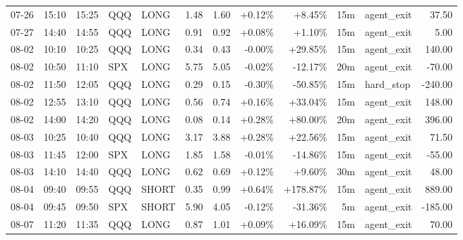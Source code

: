 \documentclass[11pt,a4paper]{article}
\begin{document}
\begin{center}
\begin{longtable}{>{\color{txtmain}}l l l l l r r r r r >{\color{txtmain}}l r}
07-26 & 15:10 & 15:25 & QQQ & LONG & 1.48 & 1.60 & \textcolor{wingreen}{+0.12\%} & \textcolor{wingreen}{+8.45\%} & 15m & agent\_exit & \textcolor{wingreen}{37.50} \\
07-27 & 14:40 & 14:55 & QQQ & LONG & 0.91 & 0.92 & \textcolor{wingreen}{+0.08\%} & \textcolor{wingreen}{+1.10\%} & 15m & agent\_exit & \textcolor{wingreen}{5.00} \\
08-02 & 10:10 & 10:25 & QQQ & LONG & 0.34 & 0.43 & \textcolor{lossred}{-0.00\%} & \textcolor{wingreen}{+29.85\%} & 15m & agent\_exit & \textcolor{wingreen}{140.00} \\
08-02 & 10:50 & 11:10 & SPX & LONG & 5.75 & 5.05 & \textcolor{lossred}{-0.02\%} & \textcolor{lossred}{-12.17\%} & 20m & agent\_exit & \textcolor{lossred}{-70.00} \\
08-02 & 11:50 & 12:05 & QQQ & LONG & 0.29 & 0.15 & \textcolor{lossred}{-0.30\%} & \textcolor{lossred}{-50.85\%} & 15m & hard\_stop & \textcolor{lossred}{-240.00} \\
08-02 & 12:55 & 13:10 & QQQ & LONG & 0.56 & 0.74 & \textcolor{wingreen}{+0.16\%} & \textcolor{wingreen}{+33.04\%} & 15m & agent\_exit & \textcolor{wingreen}{148.00} \\
08-02 & 14:00 & 14:20 & QQQ & LONG & 0.08 & 0.14 & \textcolor{wingreen}{+0.28\%} & \textcolor{wingreen}{+80.00\%} & 20m & agent\_exit & \textcolor{wingreen}{396.00} \\
08-03 & 10:25 & 10:40 & QQQ & LONG & 3.17 & 3.88 & \textcolor{wingreen}{+0.28\%} & \textcolor{wingreen}{+22.56\%} & 15m & agent\_exit & \textcolor{wingreen}{71.50} \\
08-03 & 11:45 & 12:00 & SPX & LONG & 1.85 & 1.58 & \textcolor{lossred}{-0.01\%} & \textcolor{lossred}{-14.86\%} & 15m & agent\_exit & \textcolor{lossred}{-55.00} \\
08-03 & 14:10 & 14:40 & QQQ & LONG & 0.62 & 0.69 & \textcolor{wingreen}{+0.12\%} & \textcolor{wingreen}{+9.60\%} & 30m & agent\_exit & \textcolor{wingreen}{48.00} \\
08-04 & 09:40 & 09:55 & QQQ & SHORT & 0.35 & 0.99 & \textcolor{wingreen}{+0.64\%} & \textcolor{wingreen}{+178.87\%} & 15m & agent\_exit & \textcolor{wingreen}{889.00} \\
08-04 & 09:45 & 09:50 & SPX & SHORT & 5.90 & 4.05 & \textcolor{lossred}{-0.12\%} & \textcolor{lossred}{-31.36\%} & 5m & agent\_exit & \textcolor{lossred}{-185.00} \\
08-07 & 11:20 & 11:35 & QQQ & LONG & 0.87 & 1.01 & \textcolor{wingreen}{+0.09\%} & \textcolor{wingreen}{+16.09\%} & 15m & agent\_exit & \textcolor{wingreen}{70.00} \\

\end{longtable}
\end{center}
\end{document}
